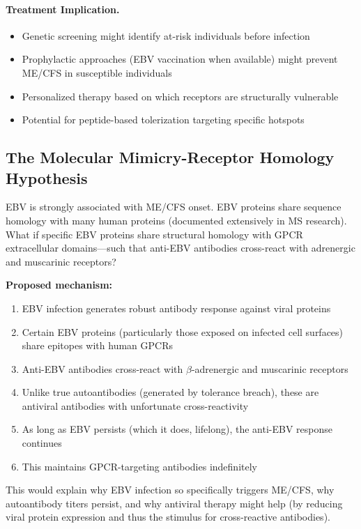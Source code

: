 \paragraph{Treatment Implication.}
\begin{itemize}
    \item Genetic screening might identify at-risk individuals before infection
    \item Prophylactic approaches (EBV vaccination when available) might prevent ME/CFS in susceptible individuals
    \item Personalized therapy based on which receptors are structurally vulnerable
    \item Potential for peptide-based tolerization targeting specific hotspots
\end{itemize}

\subsection{The Molecular Mimicry-Receptor Homology Hypothesis}

\begin{open_question}
EBV is strongly associated with ME/CFS onset. EBV proteins share sequence homology with many human proteins (documented extensively in MS research). What if specific EBV proteins share structural homology with GPCR extracellular domains---such that anti-EBV antibodies cross-react with adrenergic and muscarinic receptors?

\textbf{Proposed mechanism:}
\begin{enumerate}
    \item EBV infection generates robust antibody response against viral proteins
    \item Certain EBV proteins (particularly those exposed on infected cell surfaces) share epitopes with human GPCRs
    \item Anti-EBV antibodies cross-react with $\beta$-adrenergic and muscarinic receptors
    \item Unlike true autoantibodies (generated by tolerance breach), these are antiviral antibodies with unfortunate cross-reactivity
    \item As long as EBV persists (which it does, lifelong), the anti-EBV response continues
    \item This maintains GPCR-targeting antibodies indefinitely
\end{enumerate}

This would explain why EBV infection so specifically triggers ME/CFS, why autoantibody titers persist, and why antiviral therapy might help (by reducing viral protein expression and thus the stimulus for cross-reactive antibodies).
\end{open_question}

